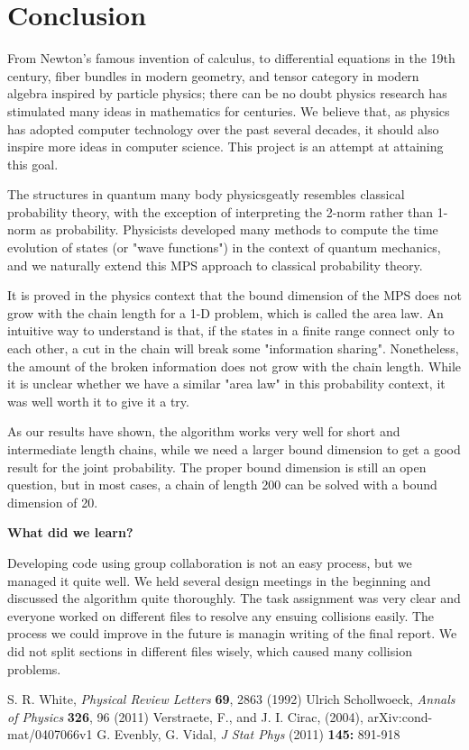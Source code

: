 \documentclass[english]{article}
\begin{document}
\section{Conclusion}
From Newton's famous invention of calculus, to differential equations in the 19th century, fiber bundles in modern geometry, and tensor category in modern algebra inspired by particle physics; there can be no doubt physics research has stimulated many ideas in mathematics for centuries. We believe that, as physics has adopted computer technology over the past several decades, it should also inspire more ideas in computer science. This project is an attempt at attaining this goal.

The structures in quantum many body physicsgeatly  resembles classical probability theory, with the exception of interpreting the 2-norm rather than 1-norm as probability. Physicists developed many methods to compute the time evolution of states (or "wave functions") in the context of quantum mechanics, and we naturally extend this MPS approach to classical probability theory.

It is proved in the physics context that the bound dimension of the MPS does not grow with the chain length for a 1-D problem, which is called the area law. An intuitive way to understand is that, if the states in a finite range connect only to each other, a cut in the chain will break some "information sharing". Nonetheless, the amount of the broken information does not grow with the chain length. While it is unclear whether we have a similar "area law" in this probability context, it was well worth it to give it a try.

As our results have shown, the algorithm works very well for short and intermediate length chains, while we need a larger bound dimension to get a good result for the joint probability. The proper bound dimension is still an open question, but in most cases, a chain of length 200 can be solved with a bound dimension of 20.

\noindent \textbf{What did we learn?}

Developing code using group collaboration is not an easy process, but we managed it quite well. We held several design meetings in the beginning and discussed the algorithm quite thoroughly. The task assignment was very clear and everyone worked on different files to resolve any ensuing collisions easily. The process we could improve in the future is managin writing of the final report. We did not split sections in different files wisely, which caused many collision problems.
\begin{thebibliography}{99}
 S. R. White, {\it Physical Review Letters} {\bf 69}, 2863 (1992)
 Ulrich Schollwoeck, {\it Annals of Physics} {\bf 326}, 96 (2011)
 Verstraete, F., and J. I. Cirac, (2004), arXiv:cond-mat/0407066v1
G. Evenbly, G. Vidal, {\it J Stat Phys} (2011) {\bf 145:} 891-918
\end{thebibliography}
\end{document}
